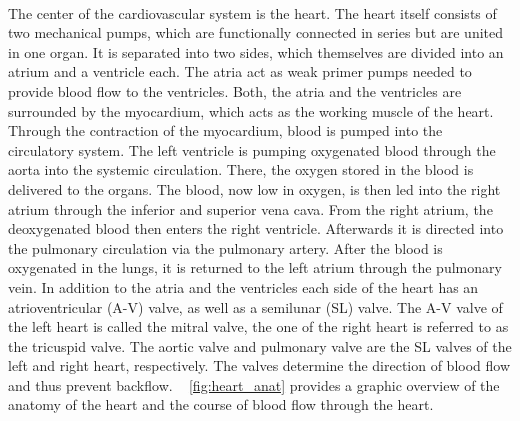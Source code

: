  \\The center of the cardiovascular system is the heart. The heart itself consists of two mechanical pumps, which are functionally connected in series but are united in one organ. It is separated into two sides, which themselves are divided into an atrium and a ventricle each. The atria act as weak primer pumps needed to provide blood flow to the ventricles. \cite{HKS4} Both, the atria and the ventricles are surrounded by the myocardium, which acts as the working muscle of the heart. Through the contraction of the myocardium, blood is pumped into the circulatory system. \cite{HKS7} The left ventricle is pumping oxygenated blood through the aorta into the systemic circulation. There, the oxygen stored in the blood is delivered to the organs. The blood, now low in oxygen, is then led into the right atrium through the inferior and superior vena cava. From the right atrium, the deoxygenated blood then enters the right ventricle. Afterwards it is directed into the pulmonary circulation via the pulmonary artery. After the blood is oxygenated in the lungs, it is returned to the left atrium through the pulmonary vein. \cite{HKS4} In addition to the atria and the ventricles each side of the heart has an atrioventricular (A-V) valve, as well as a semilunar (SL) valve. The A-V valve of the left heart is called the mitral valve, the one of the right heart is referred to as the tricuspid valve. The aortic valve and pulmonary valve are the SL valves of the left and right heart, respectively. The valves determine the direction of blood flow and thus prevent backflow. \cite{HKS7} \figurename~ \ref{fig:heart_anat} provides a graphic overview of the anatomy of the heart and the course of blood flow through the heart.


